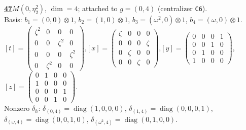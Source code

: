 \begin{samepage}\noindent\textbf{\underline{47}}\quad $M(0,\eta^{2}_{2})$, $\dim=4$; attached to $g=(0,4)$ (centralizer \texttt{C6}).\\
Basis: $b_{1}=(0,0)\otimes 1$, $b_{2}=(1,0)\otimes 1$, $b_{3}=(\omega^2,0)\otimes 1$, $b_{4}=(\omega,0)\otimes 1$.\\
$[t]=\left(\begin{smallmatrix} \zeta^2 & 0 & 0 & 0 \\ 0 & 0 & \zeta^2 & 0 \\ 0 & 0 & 0 & \zeta^2 \\ 0 & \zeta^2 & 0 & 0 \end{smallmatrix}\right)$,\quad $[x]=\left(\begin{smallmatrix} \zeta & 0 & 0 & 0 \\ 0 & 0 & 0 & \zeta \\ 0 & \zeta & 0 & 0 \\ 0 & 0 & \zeta & 0 \end{smallmatrix}\right)$,\quad $[y]=\left(\begin{smallmatrix} 0 & 0 & 0 & 1 \\ 0 & 0 & 1 & 0 \\ 0 & 1 & 0 & 0 \\ 1 & 0 & 0 & 0 \end{smallmatrix}\right)$,\quad $[z]=\left(\begin{smallmatrix} 0 & 1 & 0 & 0 \\ 1 & 0 & 0 & 0 \\ 0 & 0 & 0 & 1 \\ 0 & 0 & 1 & 0 \end{smallmatrix}\right)$.\\
Nonzero $\delta_h$: $\delta_{(0,4)}=\operatorname{diag}(1,0,0,0)$, $\delta_{(1,4)}=\operatorname{diag}(0,0,0,1)$, $\delta_{(\omega,4)}=\operatorname{diag}(0,0,1,0)$, $\delta_{(\omega^2,4)}=\operatorname{diag}(0,1,0,0)$.\end{samepage}
\medskip

